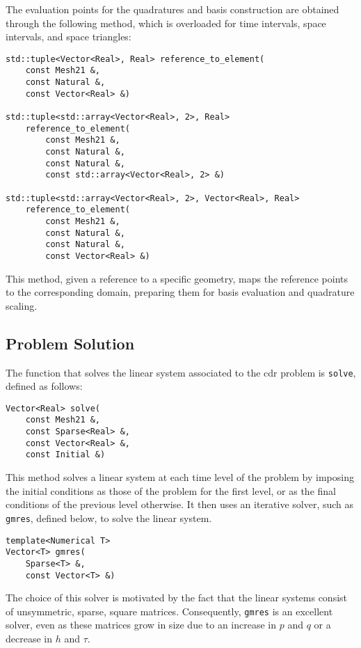 The evaluation points for the quadratures and basis construction are obtained through the following method, which is overloaded for time intervals, space intervals, and space triangles:
\begin{lstlisting}[style=cpp]
std::tuple<Vector<Real>, Real> reference_to_element(
    const Mesh21 &, 
    const Natural &, 
    const Vector<Real> &)

std::tuple<std::array<Vector<Real>, 2>, Real> 
    reference_to_element(
        const Mesh21 &, 
        const Natural &, 
        const Natural &, 
        const std::array<Vector<Real>, 2> &)

std::tuple<std::array<Vector<Real>, 2>, Vector<Real>, Real> 
    reference_to_element(
        const Mesh21 &, 
        const Natural &, 
        const Natural &, 
        const Vector<Real> &)
\end{lstlisting}
This method, given a reference to a specific geometry, maps the reference points to the corresponding domain, preparing them for basis evaluation and quadrature scaling.

\newpage
\subsection{Problem Solution}

The function that solves the linear system associated to the \acrshort{cdr} problem is \lstinline{solve}, defined as follows:
\begin{lstlisting}[style=cpp]
Vector<Real> solve(
    const Mesh21 &, 
    const Sparse<Real> &, 
    const Vector<Real> &, 
    const Initial &)
\end{lstlisting}

This method solves a linear system at each time level of the problem by imposing the initial conditions as those of the problem for the first level, or as the final conditions of the previous level otherwise. It then uses an iterative solver, such as \lstinline{gmres}, defined below, to solve the linear system.

\begin{lstlisting}[style=cpp]
template<Numerical T>
Vector<T> gmres(
    Sparse<T> &,
    const Vector<T> &)
\end{lstlisting}

The choice of this solver is motivated by the fact that the linear systems consist of unsymmetric, sparse, square matrices. Consequently, \lstinline{gmres} is an excellent solver, even as these matrices grow in size due to an increase in $p$ and $q$ or a decrease in $h$ and $\tau$.

